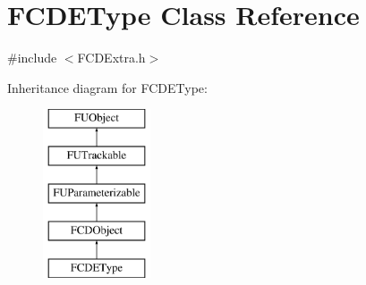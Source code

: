 \hypertarget{classFCDEType}{
\section{FCDEType Class Reference}
\label{classFCDEType}
}


{\ttfamily \#include $<$FCDExtra.h$>$}

Inheritance diagram for FCDEType:\begin{figure}[H]
\begin{center}
\leavevmode
\includegraphics[height=5.000000cm]{classFCDEType}
\end{center}
\end{figure}
